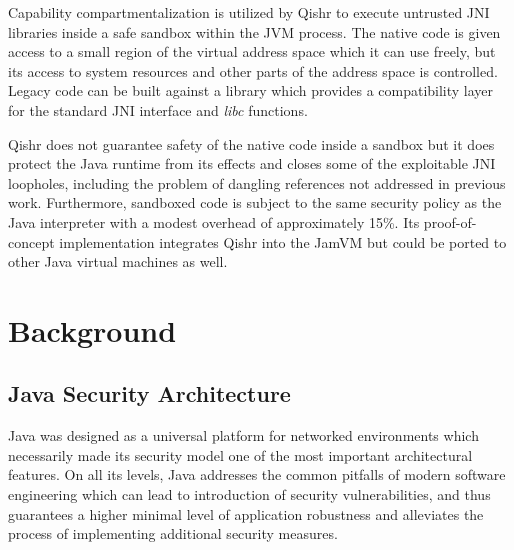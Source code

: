 \documentclass[a4paper,12pt,twoside,openright]{report}
\newcommand{\tool}[1]{\emph{#1}}
\newcommand{\lib}[1]{\tool{lib#1}}
\begin{document}
Capability compartmentalization is utilized by Qishr to execute untrusted JNI libraries inside a safe sandbox within the JVM process. The native code is given access to a small region of the virtual address space which it can use freely, but its access to system resources and other parts of the address space is controlled. Legacy code can be built against a library which provides a compatibility layer for the standard JNI interface and \lib{c} functions.

Qishr does not guarantee safety of the native code inside a sandbox but it does protect the Java runtime from its effects and closes some of the exploitable JNI loopholes, including the problem of dangling references not addressed in previous work. Furthermore, sandboxed code is subject to the same security policy as the Java interpreter with a modest overhead of approximately 15\%. Its proof-of-concept implementation integrates Qishr into the JamVM but could be ported to other Java virtual machines as well.

\chapter{Background} 

% 

\section{Java Security Architecture}

Java was designed as a universal platform for networked environments which necessarily made its security model one of the most important architectural features. On all its levels, Java addresses the common pitfalls of modern software engineering which can lead to introduction of security vulnerabilities, and thus guarantees a higher minimal level of application robustness and alleviates the process of implementing additional security measures.
\end{document}
